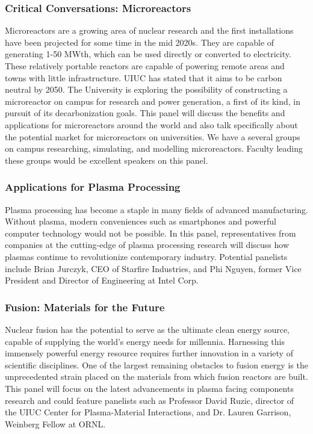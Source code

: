 \subsubsection{Critical Conversations: Microreactors}
Microreactors are a growing area of nuclear research and the first installations have been projected for some time in the mid 2020s. They are capable of generating 1-50 MWth, which can be used directly or converted to electricity. These relatively portable reactors are capable of powering remote areas and towns with little infrastructure. UIUC has stated that it aims to be carbon neutral by 2050. The University is exploring the possibility of constructing a microreactor on campus for research and power generation, a first of its kind, in pursuit of its decarbonization goals. This panel will discuss the benefits and applications for microreactors around the world and also talk specifically about the potential market for microreactors on universities. We have a several groups on campus researching, simulating, and modelling microreactors. Faculty leading these groups would be excellent speakers on this panel.


\subsubsection{Applications for Plasma Processing}
Plasma processing has become a staple in many fields of advanced manufacturing. Without plasma, modern conveniences such as smartphones and powerful computer technology would not be possible. In this panel, representatives from companies at the cutting-edge of plasma processing research will discuss how plasmas continue to revolutionize contemporary industry. Potential panelists include Brian Jurczyk, CEO of Starfire Industries, and Phi Nguyen, former Vice President and Director of Engineering at Intel Corp.

\subsubsection{Fusion: Materials for the Future}
Nuclear fusion has the potential to serve as the ultimate clean energy source, capable of supplying the world’s energy needs for millennia. Harnessing this immensely powerful energy resource requires further innovation in a variety of scientific disciplines. One of the largest remaining obstacles to fusion energy is the unprecedented strain placed on the materials from which fusion reactors are built. This panel will focus on the latest advancements in plasma facing components research and could feature panelists such as Professor David Ruzic, director of the UIUC Center for Plasma-Material Interactions, and Dr. Lauren Garrison, Weinberg Fellow at ORNL.

